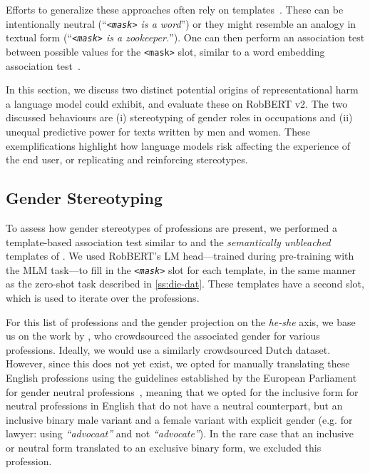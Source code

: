 \documentclass[11pt,a4paper]{article}
\begin{document}
Efforts to generalize these approaches often rely on templates~\citep{mayMeasuring2019, kurita-etal-2019-measuring}.
These can be intentionally neutral (``\emph{{\tt \textless mask\textgreater} is a word}'') or they might resemble an analogy in textual form (``\emph{{\tt \textless mask\textgreater} is a zookeeper.}'').
One can then perform an association test between possible values for the {\tt \textless mask\textgreater} slot, similar to a word embedding association test~\citep{caliskanSemantics2017}.


In this section, we discuss two distinct potential origins of representational harm \citep{blodgettLanguage2020} a language model could exhibit, and evaluate these on RobBERT v2.
The two discussed behaviours are (i) stereotyping of gender roles in occupations and (ii) unequal predictive power for texts written by men and women. These exemplifications highlight how language models risk affecting the experience of the end user, or replicating and reinforcing stereotypes. 

\subsection{Gender Stereotyping}
\label{ss:stereotyping-bias}

To assess how gender stereotypes of professions are present, we performed a template-based association test similar to \citet{kurita-etal-2019-measuring} and the \emph{semantically unbleached} templates of \citet{mayMeasuring2019}. 
We used RobBERT's LM head---trained during pre-training with the MLM task---to fill in the \emph{\tt \textless mask\textgreater} slot for each template, in the same manner as the zero-shot task described in \autoref{ss:die-dat}.
These templates have a second slot, which is used to iterate over the professions. 

For this list of professions and the gender projection on the \emph{he-she} axis, we base us on the work by \citet{bolukbasi2016man}, who crowdsourced the associated gender for various professions. 
Ideally, we would use a similarly crowdsourced Dutch dataset. However, since this does not yet exist, we opted for manually translating these English professions using the guidelines established by the European Parliament for gender neutral professions~\citep{dimitriospapadimoulisGenderneutraal2018},
meaning that we opted for the inclusive form for neutral professions in English that do not have a neutral counterpart, but an inclusive binary male variant and a female variant with explicit gender (e.g. for lawyer: using \emph{``advocaat''} and not \emph{``advocate''}).
In the rare case that an inclusive or neutral form translated to an exclusive binary form, we excluded this profession. 
\end{document}
